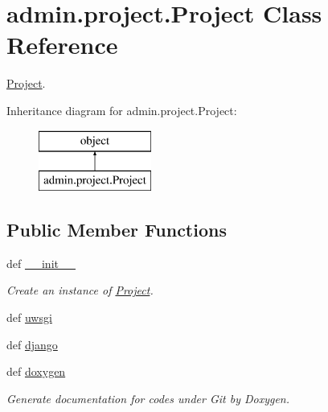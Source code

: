 \hypertarget{classadmin_1_1project_1_1Project}{\section{admin.\-project.\-Project Class Reference}
\label{classadmin_1_1project_1_1Project}
}


\hyperlink{classadmin_1_1project_1_1Project}{Project}.  


Inheritance diagram for admin.\-project.\-Project\-:\begin{figure}[H]
\begin{center}
\leavevmode
\includegraphics[height=2.000000cm]{d0/d08/classadmin_1_1project_1_1Project}
\end{center}
\end{figure}
\subsection*{Public Member Functions}
\begin{DoxyCompactItemize}
\item 
def \hyperlink{classadmin_1_1project_1_1Project_aeb44db1aabe1eae8b7d970702270dc61}{\-\_\-\-\_\-init\-\_\-\-\_\-}
\begin{DoxyCompactList}\small\item\em Create an instance of \hyperlink{classadmin_1_1project_1_1Project}{Project}. \end{DoxyCompactList}\item 
def \hyperlink{classadmin_1_1project_1_1Project_a83f54c8b5d69acab088d1cc1e6e52901}{uwsgi}
\item 
def \hyperlink{classadmin_1_1project_1_1Project_a288339834e2636bf372f02030808d2ac}{django}
\item 
def \hyperlink{classadmin_1_1project_1_1Project_af8f058021d27f5d4f5c226afb10b4ada}{doxygen}
\begin{DoxyCompactList}\small\item\em Generate documentation for codes under Git by Doxygen. \end{DoxyCompactList}\end{DoxyCompactItemize}
